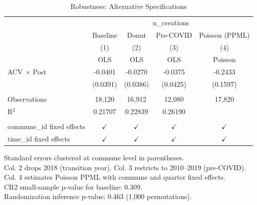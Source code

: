 
\begin{table}[htbp]
   \caption{\label{tab:robust} Robustness: Alternative Specifications}
   \bigskip
   \centering
   \begin{tabular}{lcccc}
      \toprule
       & \multicolumn{4}{c}{n\_creations}\\
                                 & Baseline      & Donut         & Pre-COVID     & Poisson (PPML) \\   
                                 & (1)           & (2)           & (3)           & (4)\\  
                                 &  OLS          & OLS           & OLS           & Poisson\\  
      \midrule 
      ACV × Post                 & -0.0401       & -0.0270       & -0.0375       & -0.2433\\   
                                 & (0.0391)      & (0.0386)      & (0.0425)      & (0.1597)\\   
       \\
      Observations               & 18,120        & 16,912        & 12,080        & 17,820\\  
      R$^2$                      & 0.21707       & 0.22839       & 0.26190       & \\  
       \\
      commune\_id fixed effects  & $\checkmark$  & $\checkmark$  & $\checkmark$  & $\checkmark$\\   
      time\_id fixed effects     & $\checkmark$  & $\checkmark$  & $\checkmark$  & $\checkmark$\\   
      \bottomrule
   \end{tabular}
   
   \par \raggedright 
   Standard errors clustered at commune level in parentheses.\\
   Col. 2 drops 2018 (transition year). Col. 3 restricts to 2010--2019 (pre-COVID).\\
   Col. 4 estimates Poisson PPML with commune and quarter fixed effects.\\
   CR2 small-sample p-value for baseline: 0.309.\\
   Randomization inference p-value: 0.463 (1,000 permutations).
\end{table}


